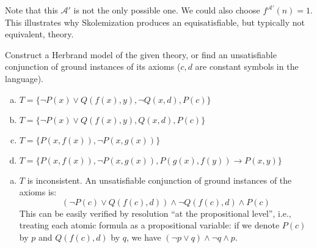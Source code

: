\begin{problem}
\begin{solution}
\begin{enumerate}[(a)]
            Note that this $\mathcal A'$ is not the only possible one. We could also choose $f^{\mathcal A'}(n)=1$. This illustrates why Skolemization produces an equisatisfiable, but typically not equivalent, theory.
        \end{enumerate}
    \end{solution}

\end{problem}



\begin{problem} 
    
    Construct a Herbrand model of the given theory, or find an unsatisfiable conjunction of ground instances of its axioms ($c,d$ are constant symbols in the language).    
    \begin{enumerate}[(a)]
        \item $T=\{\neg P(x)\vee Q(f(x),y), \neg Q(x,d), P(c)\}$
        \item $T=\{\neg P(x)\vee Q(f(x),y), Q(x,d), P(c)\}$
        \item $T=\{P(x,f(x)),\neg P(x,g(x))\}$
        \item $T=\{P(x,f(x)),\neg P(x,g(x)), P(g(x),f(y)) \to P(x,y)\}$
    \end{enumerate}

    \begin{solution}
        \begin{enumerate}[(a)]
            \item $T$ is inconsistent. An unsatisfiable conjunction of ground instances of the axioms is:
            $$
            (\neg P(c)\lor Q(f(c),d))\land \neg Q(f(c),d)\land P(c)
            $$
            This can be easily verified by resolution ``at the propositional level'', i.e., treating each atomic formula as a propositional variable: if we denote $P(c)$ by $p$ and $Q(f(c),d)$ by $q$, we have $(\neg p\lor q)\land \neg q\land p$.


\end{enumerate}
\end{solution}
\end{problem}
